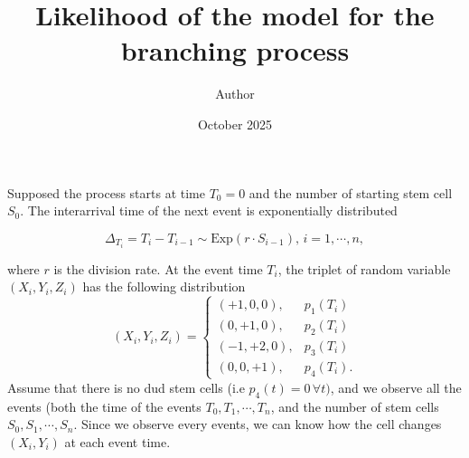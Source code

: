 \documentclass[11pt]{article}
\title{Likelihood of the model for the branching process}
\author{Author}
\date{October 2025}
\begin{document}
\maketitle

Supposed the process starts at time $T_0 = 0$ and the number of starting stem cell $S_0$. The interarrival time of the next event is exponentially distributed

$$\Delta_{T_i} = T_i - T_{i-1} \sim \text{Exp}(r\cdot S_{i-1}), \, i = 1, \cdots, n,$$

where $r$ is the division rate. At the event time $T_i$, the triplet of random variable $(X_i, Y_i, Z_i)$ has the following distribution
\begin{equation}
    (X_i, Y_i, Z_i) = \begin{cases}
        (+1, 0, 0), & p_1(T_i)\\
        (0, +1, 0), & p_2(T_i)\\
        (-1, +2, 0), &p_3(T_i) \\
        (0, 0, +1), & p_4(T_i).
    \end{cases}
\end{equation}
Assume that there is no dud stem cells (i.e $p_4(t) = 0 \, \forall t)$, and we observe all the events (both the time of the events $T_0, T_1, \cdots, T_n$, and the number of stem cells $S_0, S_1, \cdots, S_n$. Since we observe every events, we can know how the cell changes $(X_i, Y_i)$ at each event time.
\end{document}
